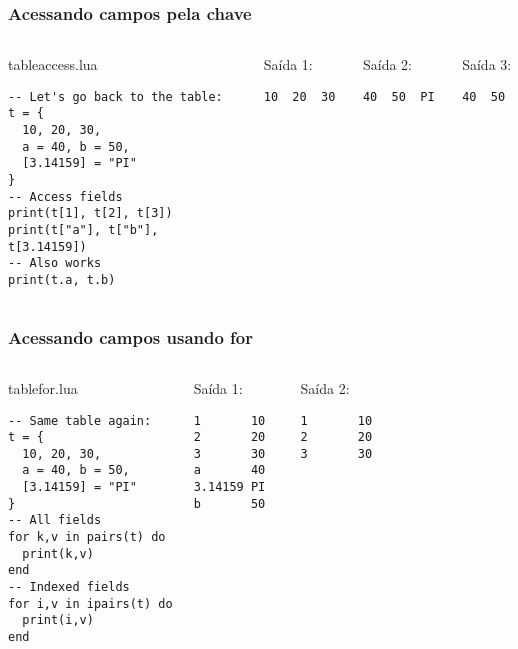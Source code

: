 \documentclass[brazil]{beamer}
\begin{document}
\begin{frame}[fragile]
  \frametitle{Acessando campos pela chave}
  \pause
  \begin{columns}
      \begin{block}{tableaccess.lua}
        \begin{lstlisting}
-- Let's go back to the table:
t = {
  10, 20, 30,
  a = 40, b = 50,
  [3.14159] = "PI"
}
-- Access fields
print(t[1], t[2], t[3])
print(t["a"], t["b"], t[3.14159])
-- Also works
print(t.a, t.b)
        \end{lstlisting}
      \end{block}
    \pause
      \begin{block}{Saída 1:}
        \begin{verbatim}
10  20  30 \end{verbatim}
      \end{block}
      \pause
      \begin{block}{Saída 2:}
        \begin{verbatim}
40  50  PI \end{verbatim}
      \end{block}
      \pause
      \begin{block}{Saída 3:}
        \begin{verbatim}
40  50 \end{verbatim}
      \end{block}
  \end{columns}
\end{frame}
\begin{frame}[fragile]
  \frametitle{Acessando campos usando for}
  \pause
  \begin{columns}
      \begin{block}{tablefor.lua}
        \begin{lstlisting}
-- Same table again:
t = {
  10, 20, 30,
  a = 40, b = 50,
  [3.14159] = "PI"
}
-- All fields
for k,v in pairs(t) do
  print(k,v)
end
-- Indexed fields
for i,v in ipairs(t) do
  print(i,v)
end
        \end{lstlisting}
      \end{block}
    \pause
      \begin{block}{Saída 1:}
        \begin{verbatim}
1       10
2       20
3       30
a       40
3.14159 PI
b       50  \end{verbatim}
      \end{block}
      \pause
      \begin{block}{Saída 2:}
        \begin{verbatim}
1       10
2       20
3       30 \end{verbatim}
      \end{block}
  \end{columns}
\end{frame}
\end{document}
